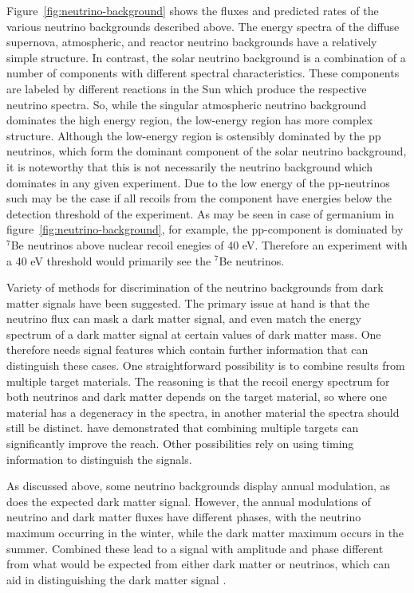 Figure~\ref{fig:neutrino-background} shows the fluxes and predicted rates of the various neutrino backgrounds described above. The energy spectra of the diffuse supernova, atmospheric, and reactor neutrino backgrounds have a relatively simple structure. In contrast, the solar neutrino background is a combination of a number of components with different spectral characteristics. These components are labeled by different reactions in the Sun which produce the respective neutrino spectra. So, while the singular atmospheric neutrino background dominates the high energy region, the low-energy region has more complex structure. Although the low-energy region is ostensibly dominated by the pp neutrinos, which form the dominant component of the solar neutrino background, it is noteworthy that this is not necessarily the neutrino background which dominates in any given experiment. Due to the low energy of the pp-neutrinos such may be the case if all recoils from the component have energies below the detection threshold of the experiment. As may be seen in case of germanium in figure~\ref{fig:neutrino-background}, for example, the pp-component is dominated by $^{7}$Be neutrinos above nuclear recoil enegies of 40 eV. Therefore an experiment with a 40 eV threshold would primarily see the $^{7}$Be neutrinos.

Variety of methods for discrimination of the neutrino backgrounds from dark matter signals have been suggested. The primary issue at hand is that the neutrino flux can mask a dark matter signal, and even match the energy spectrum of a dark matter signal at certain values of dark matter mass. One therefore needs signal features which contain further information that can distinguish these cases. One straightforward possibility is to combine results from multiple target materials. The reasoning is that the recoil energy spectrum for both neutrinos and dark matter depends on the target material, so where one material has a degeneracy in the spectra, in another material the spectra should still be distinct. \textcite{BillardFigueroaFelicianoStrigari2014} have demonstrated that combining multiple targets can significantly improve the reach. Other possibilities rely on using timing information to distinguish the signals.

As discussed above, some neutrino backgrounds display annual modulation, as does the expected dark matter signal. However, the annual modulations of neutrino and dark matter fluxes have different phases, with the neutrino maximum occurring in the winter, while the dark matter maximum occurs in the summer. Combined these lead to a signal with amplitude and phase different from what would be expected from either dark matter or neutrinos, which can aid in distinguishing the dark matter signal \parencite{Davis2015}.

